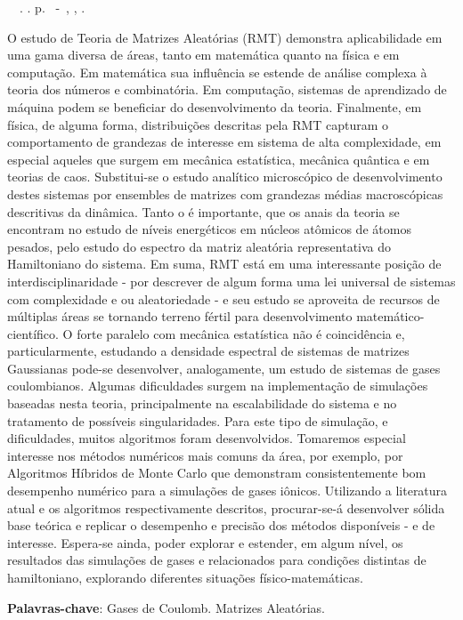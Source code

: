 \setlength{\absparsep}{18pt} %
\begin{resumo}
	\begin{flushleft} 
			\setlength{\absparsep}{0pt} %
			\SingleSpacing 
			\imprimirautorabr~~\textbf{\imprimirtituloresumo}.	\imprimirdata. \pageref{LastPage}p. 
			\imprimirtipotrabalho~-~\imprimirinstituicao, \imprimirlocal, \imprimirdata. 
 	\end{flushleft}
\OnehalfSpacing 			
O estudo de Teoria de Matrizes Aleatórias (RMT) demonstra aplicabilidade em uma gama diversa de áreas, tanto em matemática quanto na física e em computação. Em matemática sua influência se estende de análise complexa à teoria dos números e combinatória. Em computação, sistemas de aprendizado de máquina podem se beneficiar do desenvolvimento da teoria. Finalmente, em física, de alguma forma, distribuições descritas pela RMT capturam o comportamento de grandezas de interesse em sistema de alta complexidade, em especial aqueles que surgem em mecânica estatística, mecânica quântica e em teorias de caos. Substitui-se o estudo analítico microscópico de desenvolvimento destes sistemas por ensembles de matrizes com grandezas médias macroscópicas descritivas da dinâmica. Tanto o é importante, que os anais da teoria se encontram no estudo de níveis energéticos em núcleos atômicos de átomos pesados, pelo estudo do espectro da matriz aleatória representativa do Hamiltoniano do sistema. Em suma, RMT está em uma interessante posição de interdisciplinaridade - por descrever de algum forma uma lei universal de sistemas com complexidade e ou aleatoriedade - e seu estudo se aproveita de recursos de múltiplas áreas se tornando terreno fértil para desenvolvimento matemático-científico. O forte paralelo com mecânica estatística não é coincidência e, particularmente, estudando a densidade espectral de sistemas de matrizes Gaussianas pode-se desenvolver, analogamente, um estudo de sistemas de gases coulombianos. Algumas dificuldades surgem na implementação de simulações baseadas nesta teoria, principalmente na escalabilidade do sistema e no tratamento de possíveis singularidades. Para este tipo de simulação, e dificuldades, muitos algoritmos foram desenvolvidos. Tomaremos especial interesse nos métodos numéricos mais comuns da área, por exemplo, por Algoritmos Híbridos de Monte Carlo que demonstram consistentemente bom desempenho numérico para a simulações de gases iônicos. Utilizando a literatura atual e os algoritmos respectivamente descritos, procurar-se-á desenvolver sólida base teórica e replicar o desempenho e precisão dos métodos disponíveis - e de interesse. Espera-se ainda, poder explorar e estender, em algum nível, os resultados das simulações de gases e relacionados para condições distintas de hamiltoniano, explorando diferentes situações físico-matemáticas.
 

 \textbf{Palavras-chave}: Gases de Coulomb. Matrizes Aleatórias. 
\end{resumo}
